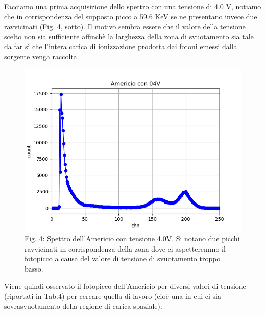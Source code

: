 \documentclass[a4paper]{article}
\begin{document}
Facciamo una prima acquisizione dello spettro con una tensione di 4.0 V, notiamo che in corrispondenza del supposto picco a 59.6 KeV se ne presentano invece due ravvicinati (Fig. 4, sotto). Il motivo sembra essere che il valore della tensione scelto non sia sufficiente affinchè la larghezza della zona di svuotamento sia tale da far sì che l'intera carica di ionizzazione prodotta dai fotoni emessi dalla sorgente venga raccolta.

\begin{figure}[!h]
\includegraphics[width=1\textwidth]{Americio_con_04V}
        \caption{Fig. 4: Spettro dell'Americio con tensione 4.0V. Si notano due picchi ravvicinati in corrispondenza della zona dove ci                                     						 aspetteremmo il fotopicco a causa del valore di tensione di svuotamento troppo basso.}
        \label{fig:4}
\end{figure}

Viene quindi osservato il fotopicco dell'Americio per diversi valori di tensione (riportati in Tab.4) per cercare quella di lavoro (cioè una in cui ci sia sovrasvuotamento della regione di carica spaziale).
      
\end{document}
